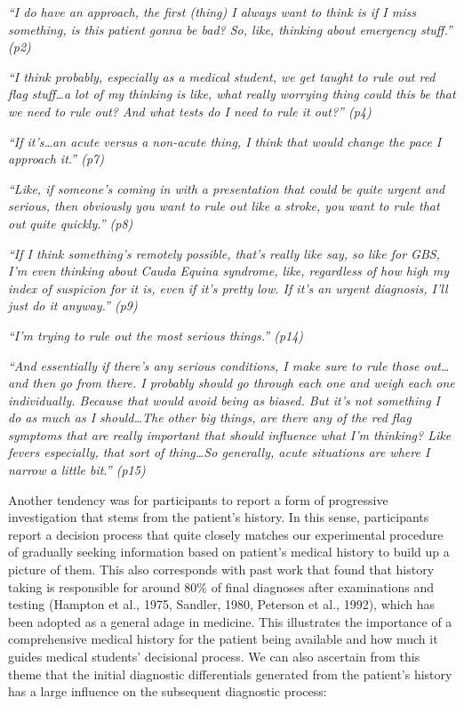\documentclass[a4paper, nobind]{templates/ociamthesis}
\begin{document}
\emph{``I do have an approach, the first (thing) I always want to think is if I miss something, is this patient gonna be bad? So, like, thinking about emergency stuff.'' (p2)}

\emph{``I think probably, especially as a medical student, we get taught to rule out red flag stuff\ldots a lot of my thinking is like, what really worrying thing could this be that we need to rule out? And what tests do I need to rule it out?'' (p4)}

\emph{``If it's\ldots an acute versus a non-acute thing, I think that would change the pace I approach it.'' (p7)}

\emph{``Like, if someone's coming in with a presentation that could be quite urgent and serious, then obviously you want to rule out like a stroke, you want to rule that out quite quickly.'' (p8)}

\emph{``If I think something's remotely possible, that's really like say, so like for GBS, I'm even thinking about Cauda Equina syndrome, like, regardless of how high my index of suspicion for it is, even if it's pretty low. If it's an urgent diagnosis, I'll just do it anyway.'' (p9)}

\emph{``I'm trying to rule out the most serious things.'' (p14)}

\emph{``And essentially if there's any serious conditions, I make sure to rule those out\ldots and then go from there. I probably should go through each one and weigh each one individually. Because that would avoid being as biased. But it's not something I do as much as I should\ldots The other big things, are there any of the red flag symptoms that are really important that should influence what I'm thinking? Like fevers especially, that sort of thing\ldots So generally, acute situations are where I narrow a little bit.'' (p15)}

\hfill\break
Another tendency was for participants to report a form of progressive investigation that stems from the patient's history. In this sense, participants report a decision process that quite closely matches our experimental procedure of gradually seeking information based on patient's medical history to build up a picture of them. This also corresponds with past work that found that history taking is responsible for around 80\% of final diagnoses after examinations and testing (Hampton et al., 1975, Sandler, 1980, Peterson et al., 1992), which has been adopted as a general adage in medicine. This illustrates the importance of a comprehensive medical history for the patient being available and how much it guides medical students' decisional process. We can also ascertain from this theme that the initial diagnostic differentials generated from the patient's history has a large influence on the subsequent diagnostic process:\\
\end{document}
